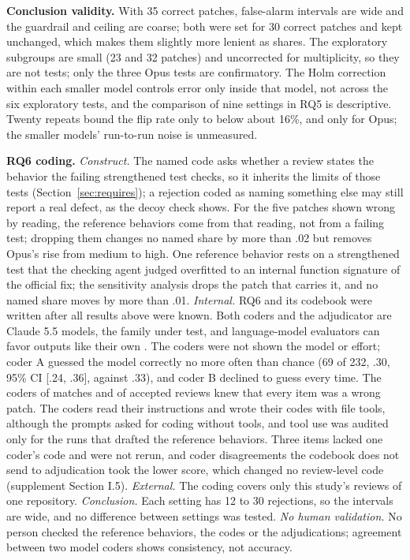 \documentclass[sigconf,nonacm]{acmart}
\begin{document}
\textbf{Conclusion validity.} With 35 correct patches, false-alarm intervals are wide and the guardrail and ceiling are coarse; both were set for 30 correct patches and kept unchanged, which makes them slightly more lenient as shares. The exploratory subgroups are small (23 and 32 patches) and uncorrected for multiplicity, so they are not tests; only the three Opus tests are confirmatory. The Holm correction within each smaller model controls error only inside that model, not across the six exploratory tests, and the comparison of nine settings in RQ5 is descriptive. Twenty repeats bound the flip rate only to below about 16\%, and only for Opus; the smaller models' run-to-run noise is unmeasured.

\textbf{RQ6 coding.} \textit{Construct.} The named code asks whether a review states the behavior the failing strengthened test checks, so it inherits the limits of those tests (Section~\ref{sec:requires}); a rejection coded as naming something else may still report a real defect, as the decoy check shows. For the five patches shown wrong by reading, the reference behaviors come from that reading, not from a failing test; dropping them changes no named share by more than .02 but removes Opus's rise from medium to high. One reference behavior rests on a strengthened test that the checking agent judged overfitted to an internal function signature of the official fix; the sensitivity analysis drops the patch that carries it, and no named share moves by more than .01. \textit{Internal.} RQ6 and its codebook were written after all results above were known. Both coders and the adjudicator are Claude 5.5 models, the family under test, and language-model evaluators can favor outputs like their own \cite{panickssery2024selfpref}. The coders were not shown the model or effort; coder A guessed the model correctly no more often than chance (69 of 232, .30, 95\% CI [.24, .36], against .33), and coder B declined to guess every time. The coders of matches and of accepted reviews knew that every item was a wrong patch. The coders read their instructions and wrote their codes with file tools, although the prompts asked for coding without tools, and tool use was audited only for the runs that drafted the reference behaviors. Three items lacked one coder's code and were not rerun, and coder disagreements the codebook does not send to adjudication took the lower score, which changed no review-level code (supplement Section I.5). \textit{External.} The coding covers only this study's reviews of one repository. \textit{Conclusion.} Each setting has 12 to 30 rejections, so the intervals are wide, and no difference between settings was tested. \textit{No human validation.} No person checked the reference behaviors, the codes or the adjudications; agreement between two model coders shows consistency, not accuracy.
\end{document}
